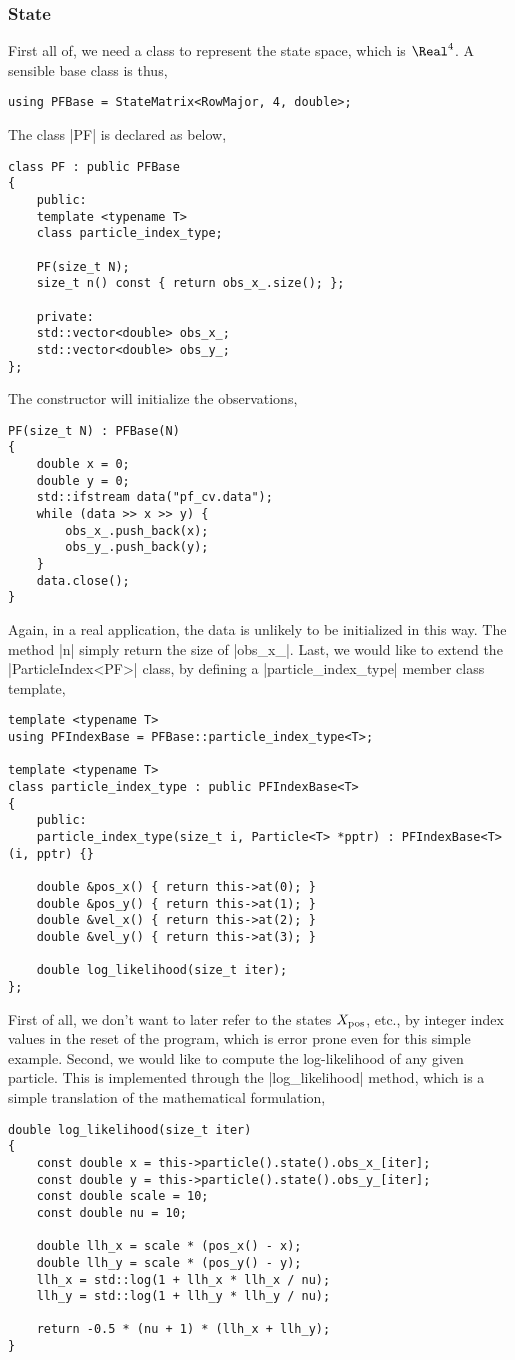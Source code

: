 \subsubsection{State}

First all of, we need a class to represent the state space, which is $\Real^4$.
A sensible base class is thus,
\begin{verbatim}
using PFBase = StateMatrix<RowMajor, 4, double>;
\end{verbatim}
The class |PF| is declared as below,
\begin{verbatim}
class PF : public PFBase
{
    public:
    template <typename T>
    class particle_index_type;

    PF(size_t N);
    size_t n() const { return obs_x_.size(); };

    private:
    std::vector<double> obs_x_;
    std::vector<double> obs_y_;
};
\end{verbatim}
The constructor will initialize the observations,
\begin{verbatim}
PF(size_t N) : PFBase(N)
{
    double x = 0;
    double y = 0;
    std::ifstream data("pf_cv.data");
    while (data >> x >> y) {
        obs_x_.push_back(x);
        obs_y_.push_back(y);
    }
    data.close();
}
\end{verbatim}
Again, in a real application, the data is unlikely to be initialized in this
way. The method |n| simply return the size of |obs_x_|. Last, we would like to
extend the |ParticleIndex<PF>| class, by defining a |particle_index_type|
member class template,
\begin{verbatim}
template <typename T>
using PFIndexBase = PFBase::particle_index_type<T>;

template <typename T>
class particle_index_type : public PFIndexBase<T>
{
    public:
    particle_index_type(size_t i, Particle<T> *pptr) : PFIndexBase<T>(i, pptr) {}

    double &pos_x() { return this->at(0); }
    double &pos_y() { return this->at(1); }
    double &vel_x() { return this->at(2); }
    double &vel_y() { return this->at(3); }

    double log_likelihood(size_t iter);
};
\end{verbatim}
First of all, we don't want to later refer to the states $X_{\mathrm{pos}}$, etc., by
integer index values in the reset of the program, which is error prone even for
this simple example. Second, we would like to compute the log-likelihood of any
given particle. This is implemented through the |log_likelihood| method, which
is a simple translation of the mathematical formulation,
\begin{verbatim}
double log_likelihood(size_t iter)
{
    const double x = this->particle().state().obs_x_[iter];
    const double y = this->particle().state().obs_y_[iter];
    const double scale = 10;
    const double nu = 10;

    double llh_x = scale * (pos_x() - x);
    double llh_y = scale * (pos_y() - y);
    llh_x = std::log(1 + llh_x * llh_x / nu);
    llh_y = std::log(1 + llh_y * llh_y / nu);

    return -0.5 * (nu + 1) * (llh_x + llh_y);
}
\end{verbatim}

